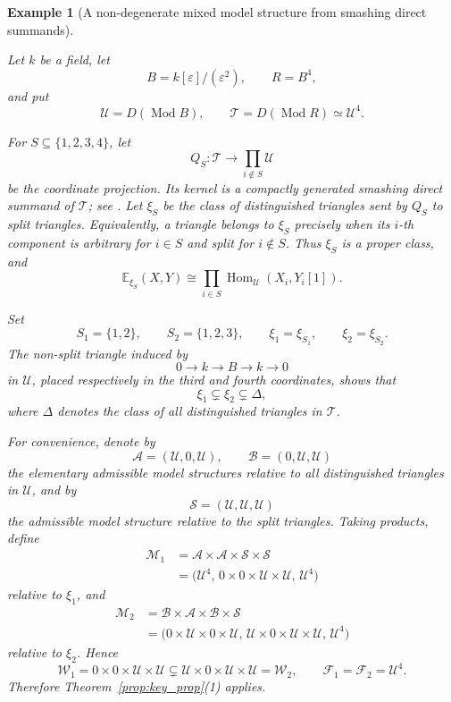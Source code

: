 \documentclass[11pt,a4paper]{amsart}
\numberwithin{equation}{section}
\theoremstyle{plain}
\newtheorem{example}[thm]{Example}
\begin{document}
\begin{example}[A non-degenerate mixed model structure from smashing direct summands]
	\label{ex:smashing-summands}
	
	Let $k$ be a field, let
	\[
	B=k[\varepsilon]/(\varepsilon^2),
	\qquad
	R=B^4,
	\]
	and put
	\[
	\mathcal U=D(\operatorname{Mod}B),
	\qquad
	\mathcal T=D(\operatorname{Mod}R)\simeq\mathcal U^4.
	\]
	
	For $S\subseteq\{1,2,3,4\}$, let
	\[
	Q_S:\mathcal T\longrightarrow\prod_{i\notin S}\mathcal U
	\]
	be the coordinate projection. Its kernel is a compactly generated
	smashing direct summand of $\mathcal T$; see
	\cite{KrauseSmashing}. Let $\xi_S$ be the class of distinguished
	triangles sent by $Q_S$ to split triangles. Equivalently, a triangle
	belongs to $\xi_S$ precisely when its $i$-th component is arbitrary for
	$i\in S$ and split for $i\notin S$. Thus $\xi_S$ is a proper class, and
	\[
	\mathbb E_{\xi_S}(X,Y)
	\cong
	\prod_{i\in S}
	\operatorname{Hom}_{\mathcal U}(X_i,Y_i[1]).
	\]
	
	Set
	\[
	S_1=\{1,2\},
	\qquad
	S_2=\{1,2,3\},
	\qquad
	\xi_1=\xi_{S_1},
	\qquad
	\xi_2=\xi_{S_2}.
	\]
	The non-split triangle induced by
	\[
	0\longrightarrow k\longrightarrow B\longrightarrow k\longrightarrow0
	\]
	in $\mathcal U$, placed respectively in the third and fourth
	coordinates, shows that
	\[
	\xi_1\subsetneq\xi_2\subsetneq\Delta,
	\]
	where $\Delta$ denotes the class of all distinguished triangles in
	$\mathcal T$.
	
	For convenience, denote by
	\[
	\mathcal A=(\mathcal U,0,\mathcal U),
	\qquad
	\mathcal B=(0,\mathcal U,\mathcal U)
	\]
	the elementary admissible model structures relative to all
	distinguished triangles in $\mathcal U$, and by
	\[
	\mathcal S=(\mathcal U,\mathcal U,\mathcal U)
	\]
	the admissible model structure relative to the split triangles.
	Taking products, define
	\[
	\begin{aligned}
		\mathcal M_1
		&=\mathcal A\times\mathcal A\times\mathcal S\times\mathcal S \\
		&=
		\bigl(
		\mathcal U^4,\,
		0\times0\times\mathcal U\times\mathcal U,\,
		\mathcal U^4
		\bigr)
	\end{aligned}
	\]
	relative to $\xi_1$, and
	\[
	\begin{aligned}
		\mathcal M_2
		&=\mathcal B\times\mathcal A\times\mathcal B\times\mathcal S \\
		&=
		\bigl(
		0\times\mathcal U\times0\times\mathcal U,\,
		\mathcal U\times0\times\mathcal U\times\mathcal U,\,
		\mathcal U^4
		\bigr)
	\end{aligned}
	\]
	relative to $\xi_2$. Hence
	\[
	\mathcal W_1
	=
	0\times0\times\mathcal U\times\mathcal U
	\subsetneq
	\mathcal U\times0\times\mathcal U\times\mathcal U
	=
	\mathcal W_2,
	\qquad
	\mathcal F_1=\mathcal F_2=\mathcal U^4.
	\]
	Therefore Theorem~\ref{prop:key_prop}(1) applies.
	

\end{example}
\end{document}
